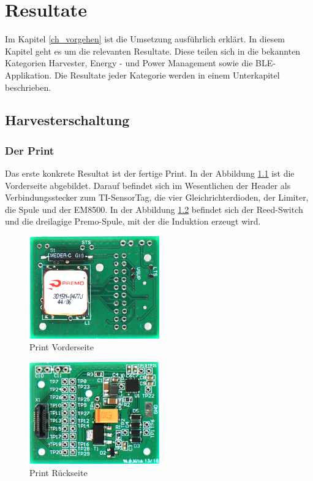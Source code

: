 \chapter{Resultate}
\label{ch_resultat}

Im Kapitel \ref{ch_vorgehen} ist die Umsetzung ausführlich erklärt. In diesem Kapitel geht es um die relevanten Resultate. Diese teilen sich in die bekannten Kategorien Harvester, Energy - und Power Management sowie die BLE-Applikation. Die Resultate jeder Kategorie werden in einem Unterkapitel beschrieben.
 
\section{Harvesterschaltung}

\subsection{Der Print}

Das erste konkrete Resultat ist der fertige Print. In der Abbildung \ref{print_vorne} ist die Vorderseite abgebildet.  Darauf befindet sich im Wesentlichen der Header als Verbindungsstecker zum TI-SensorTag, die vier Gleichrichterdioden, der Limiter, die Spule und der EM8500. In der Abbildung \ref{print_rueckseite} befindet sich der Reed-Switch und die dreilagige Premo-Spule, mit der die Induktion erzeugt wird.

\begin{figure}[ht]
    \includegraphics[width=0.5\textwidth]{4Resultate/imag/print_rueckseite.png} 
    \caption{Print Vorderseite}
    \label{print_vorne}
\end{figure}


\begin{figure}[ht]
    \includegraphics[width=0.5\textwidth]{4Resultate/imag/print_vorne.png} 
    \caption{Print Rückseite}
    \label{print_rueckseite}
\end{figure}

